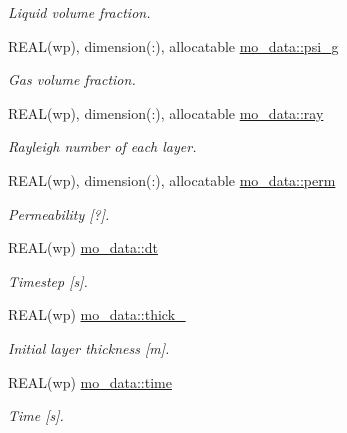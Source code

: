 \begin{DoxyCompactItemize}
\begin{DoxyCompactList}\small\item\em Liquid volume fraction. \item\end{DoxyCompactList}\item 
REAL(wp), dimension(:), allocatable \hyperlink{namespacemo__data_ab334544ada2f82dd312588426d1cfa64}{mo\_\-data::psi\_\-g}
\begin{DoxyCompactList}\small\item\em Gas volume fraction. \item\end{DoxyCompactList}\item 
REAL(wp), dimension(:), allocatable \hyperlink{namespacemo__data_a3ffdac0536a998149773806217f42543}{mo\_\-data::ray}
\begin{DoxyCompactList}\small\item\em Rayleigh number of each layer. \item\end{DoxyCompactList}\item 
REAL(wp), dimension(:), allocatable \hyperlink{namespacemo__data_ac629f6eccf4b77df3406ac2ad5ac8ea6}{mo\_\-data::perm}
\begin{DoxyCompactList}\small\item\em Permeability \mbox{[}?\mbox{]}. \item\end{DoxyCompactList}\item 
REAL(wp) \hyperlink{namespacemo__data_a6dedf87b47bcdf4151797c04485f251e}{mo\_\-data::dt}
\begin{DoxyCompactList}\small\item\em Timestep \mbox{[}s\mbox{]}. \item\end{DoxyCompactList}\item 
REAL(wp) \hyperlink{namespacemo__data_ad96d7ce134bb7b86325830161046d367}{mo\_\-data::thick\_}
\begin{DoxyCompactList}\small\item\em Initial layer thickness \mbox{[}m\mbox{]}. \item\end{DoxyCompactList}\item 
REAL(wp) \hyperlink{namespacemo__data_a9a0ee3e136f3b09016bfdffed837615a}{mo\_\-data::time}
\begin{DoxyCompactList}\small\item\em Time \mbox{[}s\mbox{]}. \item\end{DoxyCompactList}\item 

\end{DoxyCompactItemize}
